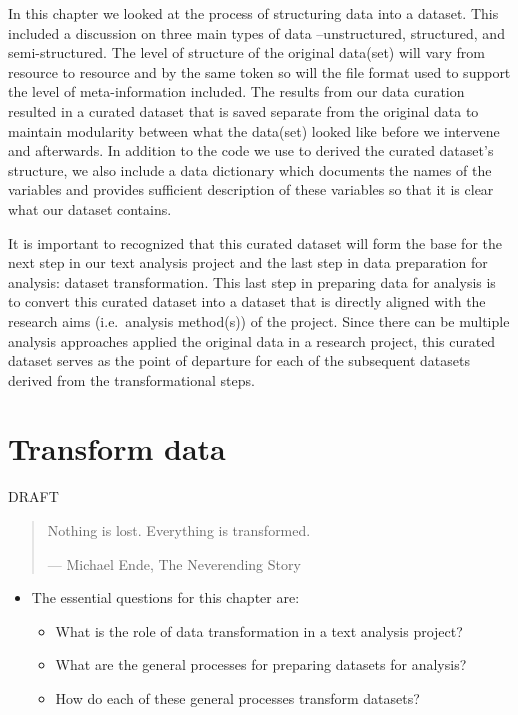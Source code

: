 \documentclass[
]{article}
\providecommand{\tightlist}{%
  \setlength{\itemsep}{0pt}\setlength{\parskip}{0pt}}
\newenvironment{rmdblock}[1]
  {\begin{shaded*}
  \begin{itemize}
  \renewcommand{\labelitemi}{
    \raisebox{-.5\height}[0pt][0pt]{
      {\setkeys{Gin}{width=2em,keepaspectratio}\texttt{[image: assets/images/\#1]}}
    }
  }
  \item
  }
  {
  \end{itemize}
  \end{shaded*}
  }
\newenvironment{rmdkey}
  {\begin{rmdblock}{key}}
  {\end{rmdblock}}
\begin{document}
In this chapter we looked at the process of structuring data into a dataset. This included a discussion on three main types of data --unstructured, structured, and semi-structured. The level of structure of the original data(set) will vary from resource to resource and by the same token so will the file format used to support the level of meta-information included. The results from our data curation resulted in a curated dataset that is saved separate from the original data to maintain modularity between what the data(set) looked like before we intervene and afterwards. In addition to the code we use to derived the curated dataset's structure, we also include a data dictionary which documents the names of the variables and provides sufficient description of these variables so that it is clear what our dataset contains.

It is important to recognized that this curated dataset will form the base for the next step in our text analysis project and the last step in data preparation for analysis: dataset transformation. This last step in preparing data for analysis is to convert this curated dataset into a dataset that is directly aligned with the research aims (i.e.~analysis method(s)) of the project. Since there can be multiple analysis approaches applied the original data in a research project, this curated dataset serves as the point of departure for each of the subsequent datasets derived from the transformational steps.

\hypertarget{transform-data}{%
\section{Transform data}\label{transform-data}}

DRAFT

\begin{quote}
Nothing is lost. Everything is transformed.

--- Michael Ende, The Neverending Story
\end{quote}

\begin{rmdkey}
The essential questions for this chapter are:

\begin{itemize}
\tightlist
\item
  What is the role of data transformation in a text analysis project?
\item
  What are the general processes for preparing datasets for analysis?
\item
  How do each of these general processes transform datasets?
\end{itemize}
\end{rmdkey}
\end{document}
